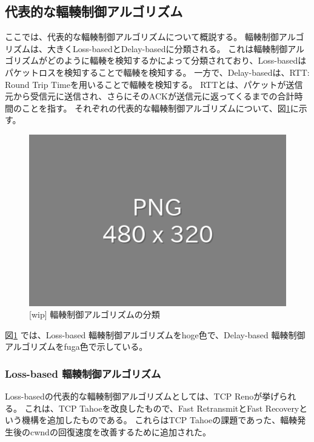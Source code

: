 \documentclass[a4paper,11pt]{jreport}
\newcommand{\figref}[1]{図\ref{#1}}
\begin{document}
\subsection{代表的な輻輳制御アルゴリズム}

ここでは、代表的な輻輳制御アルゴリズムについて概説する。
輻輳制御アルゴリズムは、大きくLoss-basedとDelay-basedに分類される。
これは輻輳制御アルゴリズムがどのように輻輳を検知するかによって分類されており、Loss-basedはパケットロスを検知することで輻輳を検知する。
一方で、Delay-basedは、RTT: Round Trip Timeを用いることで輻輳を検知する。
RTTとは、パケットが送信元から受信元に送信され、さらにそのACKが送信元に返ってくるまでの合計時間のことを指す。
それぞれの代表的な輻輳制御アルゴリズムについて、\figref{figure:congestion_control_classification}に示す。
\begin{figure}[htbp]
  \centering
  \includegraphics[width=0.6\linewidth]{fig/chap02/empty.png}
  \caption{[wip] 輻輳制御アルゴリズムの分類}
  \label{figure:congestion_control_classification}
\end{figure}
\figref{figure:congestion_control_classification} では、Loss-based 輻輳制御アルゴリズムをhoge色で、Delay-based 輻輳制御アルゴリズムをfuga色で示している。

\subsubsection*{Loss-based 輻輳制御アルゴリズム}

Loss-basedの代表的な輻輳制御アルゴリズムとしては、TCP Reno\cite{reno,tcp}が挙げられる。
これは、TCP Tahoe\cite{congestion-avoidance}を改良したもので、Fast RetransmitとFast Recoveryという機構を追加したものである。
これらはTCP Tahoeの課題であった、輻輳発生後のcwndの回復速度を改善するために追加された。
\end{document}

